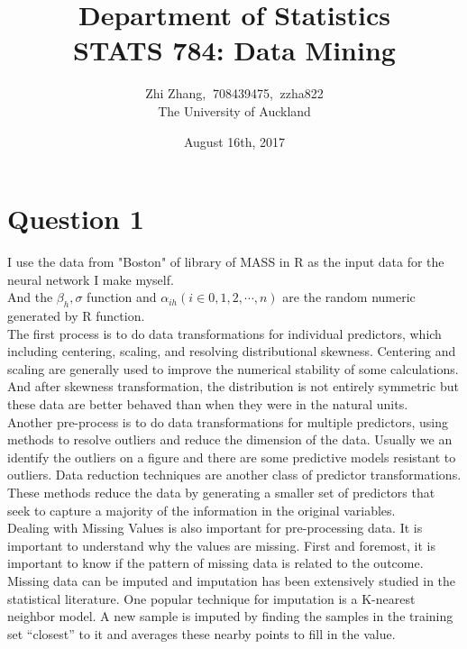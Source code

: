 \documentclass{article}%
\begin{document}
\title{Department of  Statistics \\ STATS 784: Data Mining}
\author{Zhi Zhang, $\ $708439475, $\ $zzha822
\\The University of Auckland}
\date{August 16th, 2017}
\maketitle


\section{Question 1}
I use the data from "Boston" of library of MASS in R as the input data for the neural network I make myself. \\
\indent And the $\beta_{h}, \sigma$ function and $\alpha_{ih} (i \in {0, 1, 2, \cdots, n})$ are the random numeric generated by R function.\\
\indent The first process is to do data transformations for individual predictors, which including centering, scaling, and resolving distributional skewness. Centering and scaling are generally used to improve the numerical stability of some calculations. And after skewness transformation, the distribution is not entirely symmetric but these data are better behaved than when they were in the natural units.\\
\indent Another pre-process is to do data transformations for multiple predictors, using methods to resolve outliers and reduce the dimension of the data. Usually we an identify the outliers on a figure and there are some predictive models resistant to outliers. Data reduction techniques are another class of predictor transformations. These methods reduce the data by generating a smaller set of predictors that seek to capture a majority of the information in the original variables.\\
\indent Dealing with Missing Values is also important for pre-processing data. It is important to understand why the values are missing. First and foremost,
it is important to know if the pattern of missing data is related to the outcome. Missing data can be imputed and imputation has been extensively studied in the statistical literature. One popular technique for imputation is a K-nearest neighbor model. A new sample is imputed by finding the samples in the training set “closest” to it and averages these nearby points to fill in the value.\\
\end{document}
